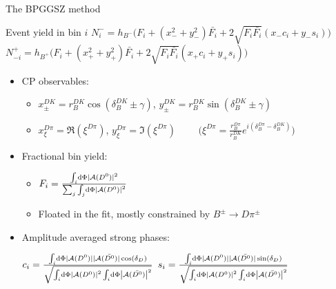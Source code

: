 \documentclass[xcolor={dvipsnames}]{beamer}
\begin{document}
\begin{frame}{The BPGGSZ method}
\begin{center}
    \begin{minipage}{0.6\textwidth}
      \begin{block}{Event yield in bin $i$}
        \footnotesize
        $N^-_i = h_{B^-}\big(F_i + (x_-^2 + y_-^2)\bar{F_i} + 2\sqrt{F_i\bar{F_i}}(x_-c_i + y_-s_i)\big)$ \\
        $N^+_{-i} = h_{B^+}\big(F_i + (x_+^2 + y_+^2)\bar{F_i} + 2\sqrt{F_i\bar{F_i}}(x_+c_i + y_+s_i)\big)$
      \end{block}
    \end{minipage}
  \end{center}
  \begin{itemize}
    \item{CP observables:}
    \begin{itemize}
      \item{$x_\pm^{DK} = r_B^{DK}\cos(\delta_B^{DK}\pm\gamma)$, \quad $y_\pm^{DK} = r_B^{DK}\sin(\delta_B^{DK}\pm\gamma)$}
      \item{$x_\xi^{D\pi} = \Re(\xi^{D\pi})$, $y_\xi^{D\pi} = \Im(\xi^{D\pi})$ $\quad\quad\Big(\xi^{D\pi} = \frac{r_B^{D\pi}}{r_B^{DK}}e^{i(\delta_B^{D\pi} - \delta_B^{DK})}\Big)$}
    \end{itemize}
    \item{Fractional bin yield:}
    \begin{itemize}
      \item{$F_i = \frac{\int_i\dd{\Phi}|\mathcal{A}(D^0)|^2}{\sum_j\int_j\dd{\Phi}\abs{\mathcal{A}(D^0)}^2}$}
      \item{Floated in the fit, mostly constrained by $B^\pm\to D\pi^\pm$}
    \end{itemize}
  \end{itemize}
  \begin{itemize}
    \item{Amplitude averaged strong phases:}
    \begin{center}
      $c_i = \frac{\int_i\dd{\Phi}|\mathcal{A}(D^0)||\mathcal{A}(\bar{D^0})|\cos(\delta_D)}{\sqrt{\int_i\dd{\Phi}\abs{\mathcal{A}(D^0)}^2\int_i\dd{\Phi}\abs{\mathcal{A}(\bar{D^0})}^2}}$ \quad $s_i = \frac{\int_i\dd{\Phi}|\mathcal{A}(D^0)||\mathcal{A}(\bar{D^0})|\sin(\delta_D)}{\sqrt{\int_i\dd{\Phi}\abs{\mathcal{A}(D^0)}^2\int_i\dd{\Phi}\abs{\mathcal{A}(\bar{D^0})}^2}}$
    \end{center}
  \end{itemize}
\end{frame}
\end{document}

